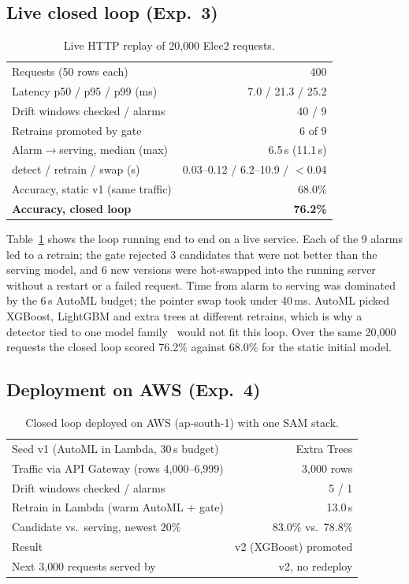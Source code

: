 \documentclass[conference]{IEEEtran}
\begin{document}
\subsection{Live closed loop (Exp.~3)}
\begin{table}[t]
\caption{Live HTTP replay of 20{,}000 Elec2 requests.}
\label{tab:live}
\centering\footnotesize\setlength{\tabcolsep}{3pt}
\begin{tabular}{lr}
\toprule
Requests (50 rows each) & 400 \\
Latency p50 / p95 / p99 (ms) & 7.0 / 21.3 / 25.2 \\
Drift windows checked / alarms & 40 / 9 \\
Retrains promoted by gate & 6 of 9 \\
Alarm$\rightarrow$serving, median (max) & 6.5\,s (11.1\,s) \\
\quad detect / retrain / swap (s) & 0.03--0.12 / 6.2--10.9 / $<$0.04 \\
Accuracy, static v1 (same traffic) & 68.0\% \\
\textbf{Accuracy, closed loop} & \textbf{76.2\%} \\
\bottomrule
\end{tabular}
\end{table}

Table~\ref{tab:live} shows the loop running end to end on a live service. Each of the 9 alarms led to a retrain; the gate rejected 3 candidates that were not better than the serving model, and 6 new versions were hot-swapped into the running server without a restart or a failed request. Time from alarm to serving was dominated by the 6\,s AutoML budget; the pointer swap took under 40\,ms. AutoML picked XGBoost, LightGBM and extra trees at different retrains, which is why a detector tied to one model family~\cite{baier2021} would not fit this loop. Over the same 20{,}000 requests the closed loop scored 76.2\% against 68.0\% for the static initial model.

\subsection{Deployment on AWS (Exp.~4)}
\begin{table}[t]
\caption{Closed loop deployed on AWS (ap-south-1) with one SAM stack.}
\label{tab:aws}
\centering\footnotesize\setlength{\tabcolsep}{3pt}
\begin{tabular}{lr}
\toprule
Seed v1 (AutoML in Lambda, 30\,s budget) & Extra Trees \\
Traffic via API Gateway (rows 4{,}000--6{,}999) & 3{,}000 rows \\
Drift windows checked / alarms & 5 / 1 \\
Retrain in Lambda (warm AutoML + gate) & 13.0\,s \\
Candidate vs.\ serving, newest 20\% & 83.0\% vs.\ 78.8\% \\
Result & v2 (XGBoost) promoted \\
Next 3{,}000 requests served by & v2, no redeploy \\
\bottomrule
\end{tabular}
\end{table}
\end{document}
